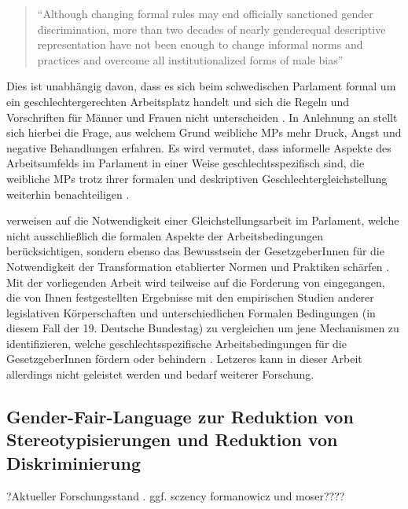 \documentclass[12pt, 
    twoside=false, 
    bibliography=totoc, 
    numbers=endperiod, 
    headings=normal, 
    toc=chapterentrydotfill
    ]{scrbook}
\begin{document}
\begin{quote}
    \enquote{Although changing formal rules may end officially sanctioned gender discrimination, more than two decades of nearly genderequal descriptive representation have not been enough to change informal norms and practices and overcome all institutionalized forms of male bias} \parencite[211]{erikson_2018}
\end{quote}

 Dies ist unabhängig davon, dass es sich beim schwedischen Parlament formal um ein geschlechtergerechten Arbeitsplatz handelt und sich die Regeln und Vorschriften für Männer und Frauen nicht unterscheiden \parencite[211]{erikson_2018}. In Anlehnung an \textcite{erikson_2018} stellt sich hierbei die Frage, aus welchem Grund weibliche MPs mehr Druck, Angst und negative Behandlungen erfahren. Es wird vermutet, dass informelle Aspekte des Arbeitsumfelds im Parlament in einer Weise geschlechtsspezifisch sind, die weibliche MPs trotz ihrer formalen und deskriptiven Geschlechtergleichstellung weiterhin benachteiligen \parencite[210]{erikson_2018}.

\textcite{erikson_2018} verweisen auf die Notwendigkeit einer Gleichstellungsarbeit im Parlament, welche nicht ausschließlich die formalen Aspekte der Arbeitsbedingungen berücksichtigen, sondern ebenso das Bewusstsein der GesetzgeberInnen für die Notwendigkeit der Transformation etablierter Normen und Praktiken schärfen \parencite[211]{erikson_2018}.
Mit der vorliegenden Arbeit wird teilweise auf die Forderung von\textcite{erikson_2018} eingegangen, die von Ihnen festgestellten Ergebnisse mit den empirischen Studien anderer legislativen Körperschaften und unterschiedlichen Formalen Bedingungen (in diesem Fall der 19. Deutsche Bundestag) zu vergleichen um jene Mechanismen zu identifizieren, welche geschlechtsspezifische Arbeitsbedingungen für die GesetzgeberInnen fördern oder behindern \parencite[211]{erikson_2018}. Letzeres kann in dieser Arbeit allerdings nicht geleistet werden und bedarf weiterer Forschung. 


\subsection{Gender-Fair-Language zur Reduktion von Stereotypisierungen und Reduktion von Diskriminierung}

?Aktueller Forschungsstand . ggf. sczency formanowicz und moser???? 
\end{document}
